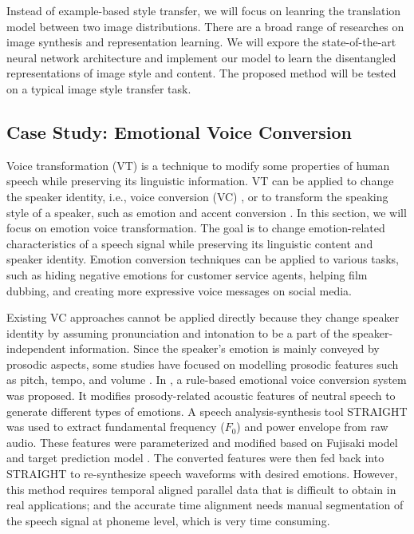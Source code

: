 \documentclass{article}
\begin{document}
Instead of example-based style transfer, we will focus on leanring the translation model between two image distributions. There are a broad range of researches on image synthesis and representation learning. We will expore the state-of-the-art neural network architecture and implement our model to learn the disentangled representations of image style and content. The proposed method will be tested on a typical image style transfer task.


\subsection{Case Study: Emotional Voice Conversion}
Voice transformation (VT) is a technique to modify some properties of human speech while preserving its linguistic information. VT can be applied to change the speaker identity, i.e., voice conversion (VC) \cite{mohammadi2017overview}, or to transform the speaking style of a speaker, such as emotion and accent conversion \cite{zhao2018accent}. In this section, we will focus on emotion voice transformation. The goal is to change emotion-related characteristics of a speech signal while preserving its linguistic content and speaker identity. Emotion conversion techniques can be applied to various tasks, such as hiding negative emotions for customer service agents, helping film dubbing, and creating more expressive voice messages on social media.

Existing VC approaches cannot be applied directly because they change speaker identity by assuming pronunciation and intonation to be a part of the speaker-independent information. Since the speaker's emotion is mainly conveyed by prosodic aspects, some studies have focused on modelling prosodic features such as pitch, tempo, and volume \cite{Wang2012EmotionalVC, wang2014multi}. In \cite{xue2018voice}, a rule-based emotional voice conversion system was proposed. It modifies prosody-related acoustic features of neutral speech to generate different types of emotions. A speech analysis-synthesis tool STRAIGHT \cite{kawahara1999restructuring} was used to extract fundamental frequency ($F_0$) and power envelope from raw audio. These features were parameterized and modified based on Fujisaki model \cite{fujisaki1984analysis} and target prediction model \cite{xue2016study}. The converted features were then fed back into STRAIGHT to re-synthesize speech waveforms with desired emotions. However, this method requires temporal aligned parallel data that is difficult to obtain in real applications; and the accurate time alignment needs manual segmentation of the speech signal at phoneme level, which is very time consuming.
\end{document}

